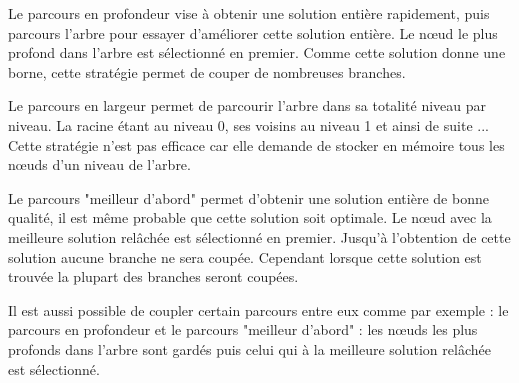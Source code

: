 Le parcours en profondeur vise à obtenir une solution entière rapidement, puis parcours l'arbre pour essayer d'améliorer cette solution entière.
Le n\oe ud le plus profond dans l'arbre est sélectionné en premier.
Comme cette solution donne une borne, cette stratégie permet de couper de nombreuses branches.

Le parcours en largeur permet de parcourir l'arbre dans sa totalité niveau par niveau. 
La racine étant au niveau 0, ses voisins au niveau 1 et ainsi de suite ...
Cette stratégie n'est pas efficace car elle demande de stocker en mémoire tous les n\oe uds d'un niveau de l'arbre.

Le parcours "meilleur d'abord" permet d'obtenir une solution entière de bonne qualité, il est même probable que cette solution soit optimale.
Le n\oe ud avec la meilleure solution relâchée est sélectionné en premier.
Jusqu'à l'obtention de cette solution aucune branche ne sera coupée.
Cependant lorsque cette solution est trouvée la plupart des branches seront coupées.

Il est aussi possible de coupler certain parcours entre eux comme par exemple : le parcours en profondeur et le parcours "meilleur d'abord" : les n\oe uds les plus profonds dans l'arbre sont gardés puis celui qui à la meilleure solution relâchée est sélectionné.




